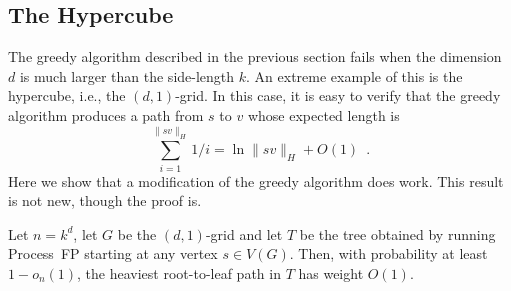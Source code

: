 \documentclass{patmorin}
\begin{document}
\subsection{The Hypercube}

The greedy algorithm described in the previous section fails when the
dimension $d$ is much larger than the side-length $k$.  An extreme
example of this is the hypercube, i.e., the $(d,1)$-grid.  In this case,
it is easy to verify that the greedy algorithm produces a path from $s$
to $v$ whose expected length is
\[
    \sum_{i=1}^{\|sv\|_H} 1/i = \ln \|sv\|_H + O(1) \enspace . 
\]
Here we show that a modification of the greedy algorithm does work.
This result is not new, though the proof is.

\begin{thm}
  Let $n=k^d$, let $G$ be the $(d,1)$-grid and let $T$ be the tree obtained
  by running Process~FP starting at any vertex $s\in V(G)$.  Then,
  with probability at least $1-o_n(1)$, the heaviest root-to-leaf path
  in $T$ has weight $O(1)$.
\end{thm}
\end{document}
